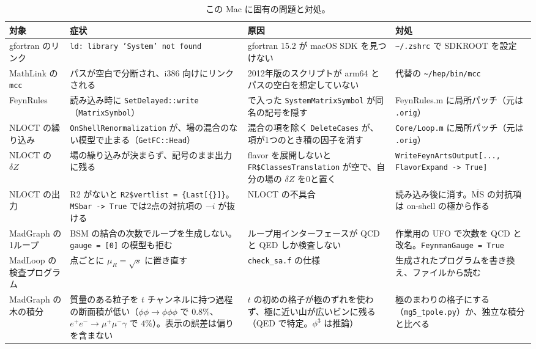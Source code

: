 \documentclass[a4paper,10pt]{ltjsarticle}
\newcommand{\bq}{\textasciigrave}
\begin{document}
\begin{table}[p]
\centering\footnotesize
\caption{この Mac に固有の問題と対処。}
\label{tab:issues}
\begin{tabularx}{\linewidth}{>{\raggedright\arraybackslash}p{2.4cm}>{\raggedright\arraybackslash}X>{\raggedright\arraybackslash}X>{\raggedright\arraybackslash}X}
\toprule
\textbf{対象} & \textbf{症状} & \textbf{原因} & \textbf{対処} \\
\midrule
gfortran のリンク & \texttt{ld: library 'System' not found} & gfortran 15.2 が macOS SDK を見つけない & \texttt{\textasciitilde/.zshrc} で SDKROOT を設定 \\
MathLink の \texttt{mcc} & パスが空白で分断され、i386 向けにリンクされる & 2012年版のスクリプトが arm64 とパスの空白を想定していない & 代替の \texttt{\textasciitilde/hep/bin/mcc} \\
FeynRules & 読み込み時に \texttt{SetDelayed::write}（\texttt{MatrixSymbol}） & 14.1 で入った \texttt{System\bq MatrixSymbol} が同名の記号を隠す & FeynRules.m に局所パッチ（元は \texttt{.orig}） \\
NLOCT の繰り込み & \texttt{OnShell\allowbreak Renormalization} が、場の混合のない模型で止まる（\texttt{GetFC::Head}） & 混合の項を除く \texttt{DeleteCases} が、項が1つのとき積の因子を消す & \texttt{Core/Loop.m} に局所パッチ（元は \texttt{.orig}） \\
NLOCT の $\delta Z$ & 場の繰り込みが決まらず、記号のまま出力に残る & flavor を展開しないと \texttt{FR\$Classes\allowbreak Translation} が空で、自分の場の $\delta Z$ を0と置く & \texttt{WriteFeynArtsOutput[..., FlavorExpand -> True]} \\
NLOCT の出力 & R2 がないと \texttt{R2\$vertlist = \{Last[\{\}]\}}。\texttt{MSbar -> True} では2点の対抗項の $-i$ が抜ける & NLOCT の不具合 & 読み込み後に消す。$\overline{\mathrm{MS}}$ の対抗項は on-shell の極から作る \\
MadGraph の1ループ & BSM の結合の次数でループを生成しない。\texttt{gauge = [0]} の模型も拒む & ループ用インターフェースが QCD と QED しか検査しない & 作業用の UFO で次数を QCD と改名。\texttt{FeynmanGauge = True} \\
MadLoop の検査プログラム & 点ごとに $\mu_R=\sqrt s$ に置き直す & \texttt{check\_sa.f} の仕様 & 生成されたプログラムを書き換え、ファイルから読む \\
MadGraph の木の積分 & 質量のある粒子を $t$ チャンネルに持つ過程の断面積が低い（$\phi\phi\to\phi\phi\phi$ で $0.8\%$、$e^+e^-\to\mu^+\mu^-\gamma$ で $4\%$）。表示の誤差は偏りを含まない & $t$ の初めの格子が極のずれを使わず、極に近い山が広いビンに残る（QED で特定。$\phi^3$ は推論） & 極のまわりの格子にする（\texttt{mg5\_tpole.py}）か、独立な積分と比べる \\

\end{tabularx}
\end{table}
\end{document}
